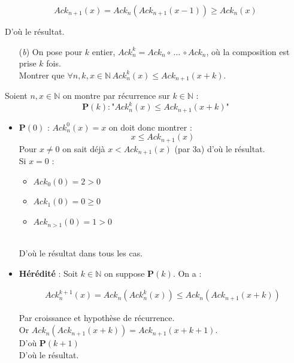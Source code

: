 \documentclass[12pt,letterpaper,boxed]{hmcpset}
\newcommand{\property}{\mathbf{P}}
\begin{document}
\begin{solution}
\begin{solution}[(a)]
$$ Ack_{n+1}(x) = Ack_{n}(Ack_{n+1}(x-1)) \geq Ack_{n}(x)$$

\noindent D'où le résultat.


\end{solution}

\newpage

\begin{problem}
\begin{itemize}  
  \item[(\textit{b})] On pose pour $k$ entier, $Ack^{k}_{n} = Ack_{n} \circ \, \dots \, \circ Ack_{n}$, où la composition est prise $k$ fois. \\
  Montrer que $ \forall n, k, x \in \mathbb{N} \, Ack^{k}_{n}(x) \leq Ack_{n+1}(x+k)$.
  
\end{itemize}



\end{problem}



\begin{solution}[(b)]
Soient $n,x \in \mathbb{N}$ on montre par récurrence sur $k \in \mathbb{N}$  :
$$\property(k) : \text{"}Ack^{k}_{n}(x) \leq Ack_{n+1}(x+k)\text{"}$$

\begin{itemize}
\item 
$\property(0)$ : $Ack^{0}_{n}(x) = x$ on doit donc montrer :
$$ x \leq Ack_{n+1}(x)$$
Pour $x \neq 0$ on sait déjà $ x < Ack_{n+1}(x)$ (par 3a) d'où le résultat. \\
Si $x = 0$ : \begin{itemize}
			\item $Ack_{0}(0) = 2 > 0$
			\item $Ack_{1}(0) = 0 \geq 0$
			\item $Ack_{n > 1}(0) = 1 > 0$
		  \end{itemize}
		  \ \\
D'où le résultat dans tous les cas. \\


\item \textbf{Hérédité} : Soit $k \in \mathbb{N}$ on suppose $\property(k)$. On a : 

\begin{align*}
Ack^{k+1}_{n}(x) = Ack_{n}(Ack^{k}_{n}(x)) \leq Ack_{n}(Ack_{n+1}(x+k))
\end{align*}

Par croissance et hypothèse de récurrence. \\
Or $Ack_{n}(Ack_{n+1}(x+k)) = Ack_{n+1}(x+k+1)$. \\
D'où $\property(k+1)$ \\
D'où le résultat.



\end{itemize}
\end{solution}
\end{solution}
\end{document}
